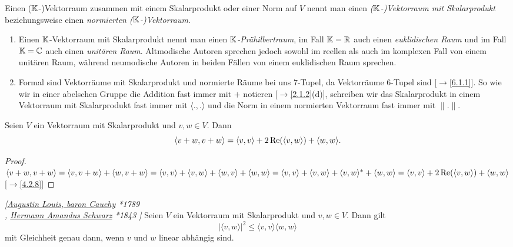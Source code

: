 \documentclass[../../main.tex]{subfiles}
\begin{document}
\begin{df}\label{11.1.5}
Einen ($\mathbb K$-)Vektorraum zusammen mit einem Skalarprodukt oder einer Norm auf $V$ nennt man einen \emph{{\rm($\mathbb K$-)}Vektorraum mit Skalarprodukt} beziehungsweise einen
\emph{normierten {\rm($\mathbb K$-)}Vektorraum}.
\end{df}

\begin{bem}\label{11.1.6}
\begin{enumerate}[\normalfont(a)]
\item
Einen $\mathbb K$-Vektorraum mit Skalarprodukt nennt man einen \emph{$\mathbb K$-Prä\-hilbert\-raum}, im Fall $\mathbb K=\mathbb R$ auch einen \emph{euklidischen Raum} und im Fall $\mathbb K=\mathbb C$ auch einen
\emph{unitären Raum}. Altmodische Autoren sprechen jedoch sowohl im reellen als auch im komplexen Fall von einem unitären Raum, während neumodische Autoren in beiden
Fällen von einem euklidischen Raum sprechen.
\item Formal sind Vektorräume mit Skalarprodukt und normierte Räume bei uns $7$-Tupel, da Vektorräume $6$-Tupel sind [$\to$\ref{6.1.1}]. So wie wir in einer abelschen Gruppe die
Addition fast immer mit $+$ notieren [$\to$\ref{2.1.2}(d)], schreiben wir das Skalarprodukt in einem Vektorraum mit Skalarprodukt fast immer mit $\langle.,.\rangle$ und die Norm
in einem normierten Vektorraum fast immer mit $\|.\|$.
\end{enumerate}
\end{bem}

\begin{lem}\label{11.1.7}
Seien $V$ ein Vektorraum mit Skalarprodukt und $v,w\in V$. Dann \[\langle v+w,v+w\rangle=\langle v,v\rangle+2\operatorname{Re}(\langle v,w\rangle)+\langle w,w\rangle.\]
\end{lem}

\begin{proof}
$\langle v+w,v+w\rangle=\langle v,v+w\rangle+\langle w,v+w\rangle=\langle v,v\rangle+\langle v,w\rangle+\langle w,v\rangle+\langle w,w\rangle\\
=\langle v,v\rangle+\langle v,w\rangle+\langle v,w\rangle^*+\langle w,w\rangle=\langle v,v\rangle+2\operatorname{Re}(\langle v,w\rangle)+\langle w,w\rangle$ [$\to$\ref{4.2.8}]
\end{proof}

\begin{sat}\label{11.1.8} \emph{[\href{http://de.wikipedia.org/wiki/Augustin_Louis_Cauchy}{Augustin Louis, baron Cauchy} *1789\\
 , \href{http://de.wikipedia.org/wiki/Hermann_Amandus_Schwarz}{Hermann Amandus Schwarz} *1843 ]}
Seien $V$ ein Vektorraum mit Skalarprodukt und $v,w\in V$. Dann gilt \[|\langle v,w\rangle|^2\le\langle v,v\rangle\langle w,w\rangle\] mit Gleichheit genau dann,
wenn $v$ und $w$ linear abhängig sind.
\end{sat}
\end{document}
